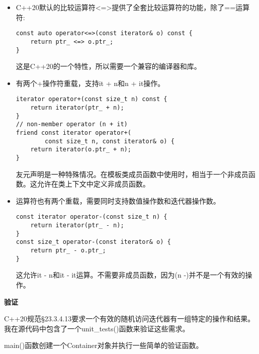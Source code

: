 \begin{itemize}
\item 
C++20默认的比较运算符<=>提供了全套比较运算符的功能，除了==运算符:

\begin{lstlisting}[style=styleCXX]
const auto operator<=>(const iterator& o) const {
	return ptr_ <=> o.ptr_;
}
\end{lstlisting}

这是C++20的一个特性，所以需要一个兼容的编译器和库。

\item 
有两个+操作符重载，支持it + n和n + it操作。

\begin{lstlisting}[style=styleCXX]
iterator operator+(const size_t n) const {
	return iterator(ptr_ + n);
}
// non-member operator (n + it)
friend const iterator operator+(
		const size_t n, const iterator& o) {
	return iterator(o.ptr_ + n);
}
\end{lstlisting}

友元声明是一种特殊情况。在模板类成员函数中使用时，相当于一个非成员函数。这允许在类上下文中定义非成员函数。

\item 
运算符也有两个重载，需要同时支持数值操作数和迭代器操作数。

\begin{lstlisting}[style=styleCXX]
const iterator operator-(const size_t n) {
	return iterator(ptr_ - n);
}
const size_t operator-(const iterator& o) {
	return ptr_ - o.ptr_;
}
\end{lstlisting}

这允许it - n和it - it运算。不需要非成员函数，因为(n -)并不是一个有效的操作。

\end{itemize}


\noindent
\textbf{验证}

C++20规范§23.3.4.13要求一个有效的随机访问迭代器有一组特定的操作和结果。我在源代码中包含了一个unit\_tests()函数来验证这些需求。

main()函数创建一个Container对象并执行一些简单的验证函数。

